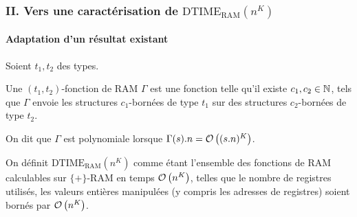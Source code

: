 \documentclass[10pt]{beamer}
\newcommand{\dtimeram}{\text{DTIME}_{\text{RAM}}\left( n^K \right)}
\begin{document}
	
	
	\begin{frame}
		\frametitle{II. Vers une caractérisation de $\dtimeram$}
		\framesubtitle{Adaptation d'un résultat existant}
		

			\begin{defn}
				Soient $t_1, t_2$ des types. 
				
				Une $(t_1, t_2)$-fonction de RAM $\Gamma$ est une fonction telle qu'il existe $c_1, c_2 \in \mathbb{N}$, tels que $\Gamma$ envoie les structures $c_1$-bornées de type $t_1$ sur des structures $c_2$-bornées de type $t_2$.
				
				On dit que $\Gamma$ est polynomiale lorsque $\Gamma(s).n = \mathcal{O}\left( (s.n)^K \right)$.
				
			\end{defn}
			
		\pause 
		\begin{defn}
			\label{def:temps_poly_RAM}
			On définit $\dtimeram$ comme étant l'ensemble des fonctions de RAM calculables sur $\{+\}$-RAM en temps $\mathcal{O}\left( n^K \right)$, telles que le nombre de registres utilisés, les valeurs entières manipulées (y compris les adresses de registres) soient bornés par $\mathcal{O}\left( n^K \right)$.
		\end{defn}

	\end{frame}
	
	
	
%		
%			
%				
%				
%			
\end{document}
